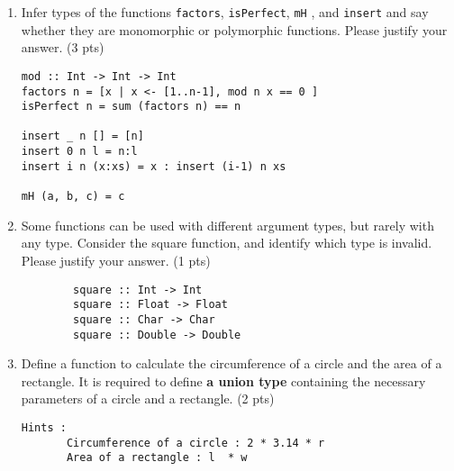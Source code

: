 \documentclass [11pt, a4wide, twoside]{article}
\begin{document}
\begin{enumerate}
\item Infer types of the functions \texttt{factors}, \texttt{isPerfect}, \texttt{mH} , and \texttt{insert} and say whether they are monomorphic or polymorphic functions. Please justify your answer. (3 pts)


\begin{small}
\begin{verbatim}
mod :: Int -> Int -> Int
factors n = [x | x <- [1..n-1], mod n x == 0 ] 
isPerfect n = sum (factors n) == n

insert _ n [] = [n]
insert 0 n l = n:l 
insert i n (x:xs) = x : insert (i-1) n xs

mH (a, b, c) = c
\end{verbatim}
\end{small}

\vspace{0.2cm}
\solution{}


\item Some functions can be used with different argument types, but rarely with any type. Consider the square function, and identify which type is invalid. Please justify your answer. (1 pts)
\begin{small}
\begin{verbatim}
        square :: Int -> Int
        square :: Float -> Float
        square :: Char -> Char
        square :: Double -> Double
\end{verbatim}
\end{small}


\item Define a function to calculate the circumference of a circle and the area of a rectangle. It is required to define \textbf{a union type} containing the necessary parameters of a circle and a rectangle.          (2 pts)
\begin{small}
\begin{verbatim}
Hints : 
	   Circumference of a circle : 2 * 3.14 * r
	   Area of a rectangle : l  * w 
\end{verbatim}
\end{small}

\solution{}

\end{enumerate}
\end{document}
